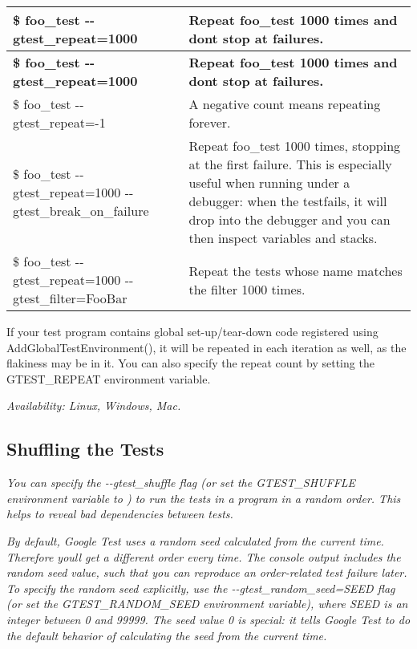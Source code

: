 {\itshape \tabulinesep=1mm
\begin{longtabu} spread 0pt [c]{*{2}{|X[-1]}|}
\hline
\rowcolor{\tableheadbgcolor}\textbf{ {\ttfamily \$ foo\+\_\+test -\/-\/gtest\+\_\+repeat=1000} }&\textbf{ Repeat foo\+\_\+test 1000 times and don\textquotesingle{}t stop at failures.  }\\
\endfirsthead
\hline
\endfoot
\hline
\rowcolor{\tableheadbgcolor}\textbf{ {\ttfamily \$ foo\+\_\+test -\/-\/gtest\+\_\+repeat=1000} }&\textbf{ Repeat foo\+\_\+test 1000 times and don\textquotesingle{}t stop at failures.  }\\
\endhead
{\ttfamily \$ foo\+\_\+test -\/-\/gtest\+\_\+repeat=-\/1} &A negative count means repeating forever. \\
{\ttfamily \$ foo\+\_\+test -\/-\/gtest\+\_\+repeat=1000 -\/-\/gtest\+\_\+break\+\_\+on\+\_\+failure} &Repeat foo\+\_\+test 1000 times, stopping at the first failure. This is especially useful when running under a debugger\+: when the testfails, it will drop into the debugger and you can then inspect variables and stacks. \\
{\ttfamily \$ foo\+\_\+test -\/-\/gtest\+\_\+repeat=1000 -\/-\/gtest\+\_\+filter=Foo\+Bar} &Repeat the tests whose name matches the filter 1000 times. \\
\end{longtabu}
If your test program contains global set-\/up/tear-\/down code registered using {\ttfamily Add\+Global\+Test\+Environment()}, it will be repeated in each iteration as well, as the flakiness may be in it. You can also specify the repeat count by setting the {\ttfamily G\+T\+E\+S\+T\+\_\+\+R\+E\+P\+E\+AT} environment variable.}

{\itshape {\itshape Availability\+:} Linux, Windows, Mac.}

{\itshape \subsection*{Shuffling the Tests}}

{\itshape }

{\itshape You can specify the {\ttfamily -\/-\/gtest\+\_\+shuffle} flag (or set the {\ttfamily G\+T\+E\+S\+T\+\_\+\+S\+H\+U\+F\+F\+LE} environment variable to {}) to run the tests in a program in a random order. This helps to reveal bad dependencies between tests.}

{\itshape By default, Google Test uses a random seed calculated from the current time. Therefore you\textquotesingle{}ll get a different order every time. The console output includes the random seed value, such that you can reproduce an order-\/related test failure later. To specify the random seed explicitly, use the {\ttfamily -\/-\/gtest\+\_\+random\+\_\+seed=S\+E\+ED} flag (or set the {\ttfamily G\+T\+E\+S\+T\+\_\+\+R\+A\+N\+D\+O\+M\+\_\+\+S\+E\+ED} environment variable), where {\ttfamily S\+E\+ED} is an integer between 0 and 99999. The seed value 0 is special\+: it tells Google Test to do the default behavior of calculating the seed from the current time.}

